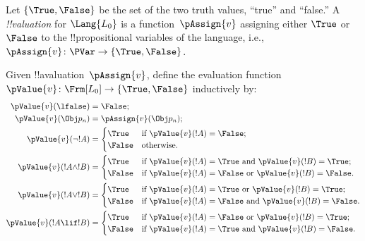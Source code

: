

\begin{defn}[!!^{valuation}s]
Let $\{\True, \False\}$ be the set of the two truth values, ``true''
and ``false.'' A \emph{!!{valuation}} for $\Lang{L_0}$ is a
function~$\pAssign{v}$ assigning either $\True$ or $\False$ to the
!!{propositional variable}s of the language, i.e., $\pAssign{v} \colon
\PVar \to \{\True, \False \}$.
\end{defn}

\begin{defn}
  Given !!a{valuation}~$\pAssign{v}$, define the evaluation function
  $\pValue{v} \colon \Frm[L_0] \to \{\True, \False \}$ inductively by:
  \begin{align*}
    \pValue{v}(\lfalse) & = \False; \\
    
    \pValue{v}(\Obj p_n) & = \pAssign{v}(\Obj p_n); \\
    \pValue{v}(\lnot !A) & = \begin{cases}
        \True & \text{if } \pValue{v}(!A) = \False;\\
        \False & \text{otherwise.}
      \end{cases} \\ 
    \pValue{v}(!A \land !B) & = \begin{cases}
        \True &
        \text{if $\pValue{v}(!A) = \True$ and $\pValue{v}(!B) = \True$;}\\
        \False &
        \text{if $\pValue{v}(!A) = \False$ or $\pValue{v}(!B) = \False$}.
      \end{cases}\\
    \pValue{v}(!A \lor !B) & = \begin{cases}
        \True &
        \text{if $\pValue{v}(!A) = \True$ or $\pValue{v}(!B) = \True$;}\\
        \False &
        \text{if $\pValue{v}(!A) = \False$ and $\pValue{v}(!B) = \False$}.
      \end{cases}\\
    \pValue{v}(!A \lif !B) & = \begin{cases}
        \True &
        \text{if $\pValue{v}(!A) = \False$ or $\pValue{v}(!B) = \True$;}\\
        \False &
        \text{if $\pValue{v}(!A) = \True$ and $\pValue{v}(!B) = \False$}.
      \end{cases}\\
    
\end{align*}
\end{defn}

